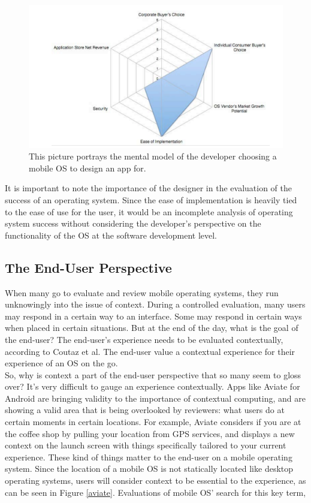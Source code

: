\documentclass[11pt]{article}
\begin{document}
\begin{figure}[h]
\begin{center}
\includegraphics{developerPerspective}
\caption{This picture portrays the mental model of the developer choosing a mobile OS to design an app for. \cite{Palme}}
\label{developerPerspective}
\end{center}
\end{figure}
It is important to note the importance of the designer in the evaluation of the success of an operating system. Since the ease of implementation is heavily tied to the ease of use for the user, it would be an incomplete analysis of operating system success without considering the developer's perspective on the functionality of the OS at the software development level.

\subsection{The End-User Perspective}
When many go to evaluate and review mobile operating systems, they run unknowingly into the issue of context. During a controlled evaluation, many users may respond in a certain way to an interface. Some may respond in certain ways when placed in certain situations. But at the end of the day, what is the goal of the end-user? The end-user's experience needs to be evaluated contextually, according to Coutaz et al. The end-user value a contextual experience for their experience of an OS on the go. \cite{Coutaz} \\
\indent So, why is context a part of the end-user perspective that so many seem to gloss over? It's very difficult to gauge an experience contextually. Apps like Aviate for Android are bringing validity to the importance of contextual computing, and are showing a valid area that is being overlooked by reviewers: what users do at certain moments in certain locations. For example, Aviate considers if you are at the coffee shop by pulling your location from GPS services, and displays a new context on the launch screen with things specifically tailored to your current experience. \cite{Aviate} These kind of things matter to the end-user on a mobile operating system. Since the location of a mobile OS is not statically located like desktop operating systems, users will consider context to be essential to the experience, as can be seen in Figure \ref{aviate}. Evaluations of mobile OS' search for this key term, 
\end{document}
